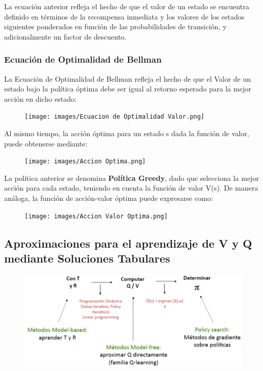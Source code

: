 \documentclass[11pt]{article}
\makeatletter
\def\maxwidth{\ifdim\Gin@nat@width>\linewidth\linewidth
    \else\Gin@nat@width\fi}
\let\Oldincludegraphics\includegraphics
\renewcommand{\includegraphics}[1]{\Oldincludegraphics[width=.8\maxwidth]{#1}}
\makeatother
\begin{document}
La ecuación anterior refleja el hecho de que el valor de un estado se
encuentra definido en términos de la recompensa inmediata y los valores
de los estados siguientes ponderados en función de las probabilidades de
transición, y adicionalmente un factor de descuento.

    \subsubsection{Ecuación de Optimalidad de
Bellman}\label{ecuaciuxf3n-de-optimalidad-de-bellman}

La Ecuación de Optimalidad de Bellman refleja el hecho de que el Valor
de un estado bajo la política óptima debe ser igual al retorno esperado
para la mejor acción en dicho estado:

\begin{figure}
\centering
\texttt{[image: images/Ecuacion de Optimalidad Valor.png]}
\caption{}
\end{figure}

Al mismo tiempo, la acción óptima para un estado s dada la función de
valor, puede obtenerse mediante:

\begin{figure}
\centering
\texttt{[image: images/Accion Optima.png]}
\caption{}
\end{figure}

La política anterior se denomina \textbf{Política Greedy}, dado que
selecciona la mejor acción para cada estado, teniendo en cuenta la
función de valor V(s). De manera análoga, la función de acción-valor
óptima puede expresarse como:

\begin{figure}
\centering
\texttt{[image: images/Accion Valor Optima.png]}
\caption{}
\end{figure}

    \subsection{Aproximaciones para el aprendizaje de V y Q mediante
Soluciones
Tabulares}\label{aproximaciones-para-el-aprendizaje-de-v-y-q-mediante-soluciones-tabulares}

\begin{figure}
\centering
\includegraphics{images/Aproximaciones al aprendizaje.png}
\caption{}
\end{figure}
\end{document}
